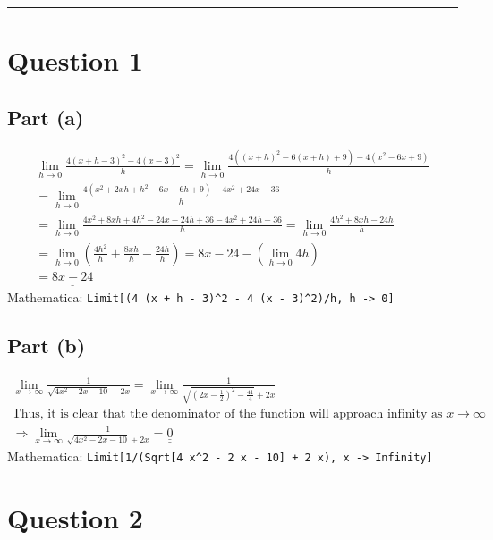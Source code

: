 \documentclass[letterpaper,10pt]{article}
\newcommand{\doubleu}[1]{\underline{\underline{#1}}}
\newcommand{\mathematica}[1]{Mathematica: \texttt{#1}}
\begin{document}
	 \newline
	 \newline
	 \newline
	\newline \hrule


	\section{Question 1}

		\subsection{Part (a)}
			\begin{gather*}
				\lim_{h \rightarrow 0} \frac{4(x+h-3)^2-4(x-3)^2}{h}
				= \lim_{h \rightarrow 0} \frac{4((x+h)^2 - 6(x+h) + 9)-4(x^2-6x+9)}{h} \\
				= \lim_{h \rightarrow 0} \frac{4(x^2+2xh+h^2-6x-6h+9)-4x^2+24x-36}{h} \\
				= \lim_{h \rightarrow 0} \frac{4x^2+8xh+4h^2-24x-24h+36-4x^2+24h-36}{h}
				= \lim_{h \rightarrow 0} \frac{4h^2+8xh-24h}{h} \\
				= \lim_{h \rightarrow 0} (\frac{4h^2}{h} + \frac{8xh}{h} - \frac{24h}{h})
				= 8x - 24 - (\lim_{h \rightarrow 0} 4h) \\
				= \doubleu{8x-24}
			\end{gather*}
			\mathematica{Limit[(4 (x + h - 3)\^{}2 - 4 (x - 3)\^{}2)/h, h -> 0]}

		\subsection{Part (b)}
			\begin{gather*}
				\lim_{x \rightarrow \infty} \frac{1}{\sqrt{4x^2-2x-10}+2x}
				= \lim_{x \rightarrow \infty} \frac{1}{\sqrt{(2x-\frac{1}{2})^2-\frac{41}{4}}+2x}\\
				\text{Thus, it is clear that the denominator of the function will approach infinity as } x \rightarrow \infty \\
				\Rightarrow \lim_{x \rightarrow \infty} \frac{1}{\sqrt{4x^2-2x-10}+2x}
				= \doubleu{0}
			\end{gather*}
			\mathematica{Limit[1/(Sqrt[4 x\^{}2 - 2 x - 10] + 2 x), x -> Infinity]}


	\section{Question 2}
\end{document}
